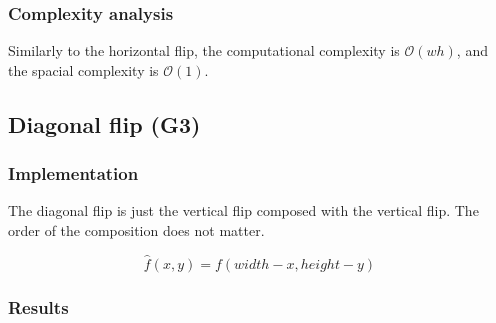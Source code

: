 \documentclass[12pt]{article}
\theoremstyle{definition}
\begin{document}
\subsubsection{Complexity analysis}
Similarly to the horizontal flip,
the computational complexity is $\mathcal{O}(wh)$, and the spacial complexity is $\mathcal{O}(1)$.

\subsection{Diagonal flip (G3)}

\subsubsection{Implementation}

The diagonal flip is just the vertical flip composed with the vertical flip.
The order of the composition does not matter.

\begin{equation}
    \hat{f}(x,y) = f(width - x, height - y)
\end{equation}

\subsubsection{Results}
\end{document}
